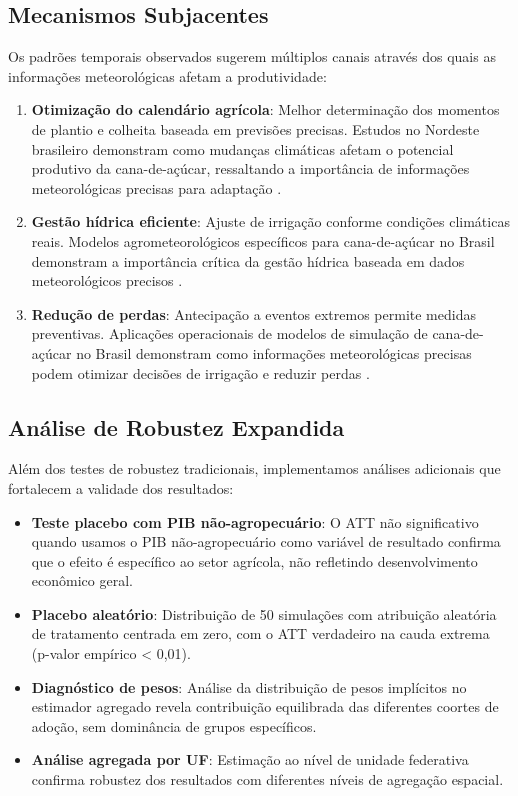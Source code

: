 \documentclass[
	12pt,				%
	oneside,			%
	a4paper,			%
	english,			%
	french,				%
	spanish,			%
	brazil				%
	]{abntex2}
\begin{document}
\subsection{Mecanismos Subjacentes}

Os padrões temporais observados sugerem múltiplos canais através dos quais as informações meteorológicas afetam a produtividade:

\begin{enumerate}
\item \textbf{Otimização do calendário agrícola}: Melhor determinação dos momentos de plantio e colheita baseada em previsões precisas. Estudos no Nordeste brasileiro demonstram como mudanças climáticas afetam o potencial produtivo da cana-de-açúcar, ressaltando a importância de informações meteorológicas precisas para adaptação \cite{carvalho2015}.

\item \textbf{Gestão hídrica eficiente}: Ajuste de irrigação conforme condições climáticas reais. Modelos agrometeorológicos específicos para cana-de-açúcar no Brasil demonstram a importância crítica da gestão hídrica baseada em dados meteorológicos precisos \cite{monteiro2017, marin2015}.

\item \textbf{Redução de perdas}: Antecipação a eventos extremos permite medidas preventivas. Aplicações operacionais de modelos de simulação de cana-de-açúcar no Brasil demonstram como informações meteorológicas precisas podem otimizar decisões de irrigação e reduzir perdas \cite{vianna2016}.

\end{enumerate}


\subsection{Análise de Robustez Expandida}

Além dos testes de robustez tradicionais, implementamos análises adicionais que fortalecem a validade dos resultados:

\begin{itemize}
\item \textbf{Teste placebo com PIB não-agropecuário}: O ATT não significativo quando usamos o PIB não-agropecuário como variável de resultado confirma que o efeito é específico ao setor agrícola, não refletindo desenvolvimento econômico geral.

\item \textbf{Placebo aleatório}: Distribuição de 50 simulações com atribuição aleatória de tratamento centrada em zero, com o ATT verdadeiro na cauda extrema (p-valor empírico < 0,01).

\item \textbf{Diagnóstico de pesos}: Análise da distribuição de pesos implícitos no estimador agregado revela contribuição equilibrada das diferentes coortes de adoção, sem dominância de grupos específicos.

\item \textbf{Análise agregada por UF}: Estimação ao nível de unidade federativa confirma robustez dos resultados com diferentes níveis de agregação espacial.
\end{itemize}
\end{document}
